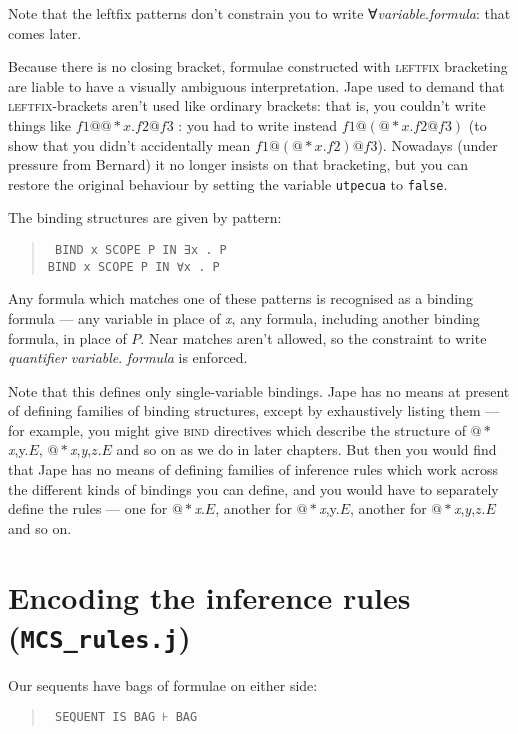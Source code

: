 Note that the leftfix patterns don't constrain you to write ∀\textit{variable}.\textit{formula}: that comes later.

Because there is no closing bracket, formulae constructed with \textsc{leftfix} bracketing are liable to have a visually ambiguous interpretation. Jape used to demand that \textsc{leftfix}-brackets aren't used like ordinary brackets: that is, you couldn't write things like $f1@@*x.f2@f3$ : you had to write instead $f1@(@*x.f2@f3)$ (to show that you didn't accidentally mean $f1@(@*x.f2) @f3$). Nowadays (under pressure from Bernard) it no longer insists on that bracketing, but you can restore the original behaviour by setting the variable \texttt{utpecua} to \texttt{false}.

The binding structures are given by pattern:
\begin{quote}\tt\small
BIND    x SCOPE P IN ∃x . P\\
BIND    x SCOPE P IN ∀x . P
\end{quote}
Any formula which matches one of these patterns is recognised as a binding formula --- any variable in place of \textit{x}, any formula, including another binding formula, in place of $P$. Near matches aren't allowed, so the constraint to write \textit{quantifier} \textit{variable}. \textit{formula} is enforced.

Note that this defines only single-variable bindings. Jape has no means at present of defining families of binding structures, except by exhaustively listing them --- for example, you might give \textsc{bind} directives which describe the structure of \ensuremath{@*}\textit{x},y.$E$, \ensuremath{@*}\textit{x},\textit{y},$z$.$E$ and so on as we do in later chapters. But then you would find that Jape has no means of defining families of inference rules which work across the different kinds of bindings you can define, and you would have to separately define the rules --- one for \ensuremath{@*}\textit{x}.$E$, another for \ensuremath{@*}\textit{x},y.$E$, another for \ensuremath{@*}\textit{x},\textit{y},$z$.$E$ and so on.

\section{Encoding the inference rules (\texttt{MCS\_rules.j})}

Our sequents have bags of formulae on either side:

\begin{quote}\tt\small
SEQUENT IS BAG ⊦ BAG
\end{quote}

